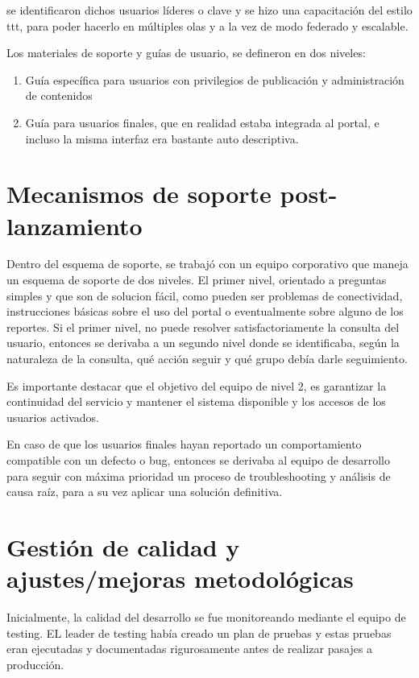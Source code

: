 se identificaron dichos usuarios líderes o clave y se hizo una capacitación del estilo \gls{ttt}, para poder hacerlo en múltiples olas y a la vez de modo federado y escalable.

Los materiales de soporte y guías de usuario, se defineron en dos niveles: 
\begin{enumerate}
    \item Guía específica para usuarios con privilegios de publicación y administración de contenidos
    \item Guía para usuarios finales, que en realidad estaba integrada al portal, e incluso la misma interfaz era bastante auto descriptiva.
\end{enumerate}

\section{Mecanismos de soporte post-lanzamiento}

Dentro del esquema de soporte, se trabajó con un equipo corporativo que maneja un esquema de soporte de dos niveles. El primer nivel, orientado a preguntas simples y que son de solucion fácil, como pueden ser problemas de conectividad, instrucciones básicas sobre el uso del portal o eventualmente sobre alguno de los reportes. Si el primer nivel, no puede resolver satisfactoriamente la consulta del usuario, entonces se derivaba a un segundo nivel donde se identificaba, según la naturaleza de la consulta, qué acción seguir y qué grupo debía darle seguimiento.

Es importante destacar que el objetivo del equipo de nivel 2, es garantizar la continuidad del servicio y mantener el sistema disponible y los accesos de los usuarios activados.

En caso de que los usuarios finales hayan reportado un comportamiento compatible con un defecto o bug, entonces se derivaba al equipo de desarrollo para seguir con máxima prioridad un proceso de troubleshooting y análisis de causa raíz, para a su vez aplicar una solución definitiva.


\section{Gestión de calidad y ajustes/mejoras metodológicas}


Inicialmente, la calidad del desarrollo se fue monitoreando mediante el equipo de testing. EL leader de testing había creado un plan de pruebas y estas pruebas eran ejecutadas y documentadas rigurosamente antes de realizar pasajes a producción. 


